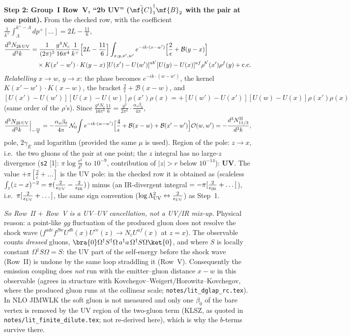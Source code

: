 \medskip
\noindent\textbf{Step 2: Group~I Row~V, ``2b UV'' ($\bar{\mf{C}}_{1}^{\dagger}\mf{B}_{2}$ with the pair at one point).} From the checked row, with the coefficient $\frac{1}{k^{+}}\int_{\Lambda}^{k^{+}-\Lambda}dp^{+}[\dots]=2L-\frac{11}{6}$,
\begin{align}
\frac{d^{3}N_{2b\,\rm UV}}{d^{3}k}&=\frac{1}{(2\pi)^{3}}\frac{g^{4}N_{c}}{16\pi^{4}}\frac{1}{k^{+}}\Big[2L-\frac{11}{6}\Big]\int_{x,y,x',w'}e^{-ik\cdot(x-w')}\Big[\frac{2}{\epsilon}+\mathcal{B}(y-x)\Big]\notag\\&\quad\times K(x'-w')\cdot K(y-x)\,[U(x')-U(w')]^{ab'}[U(y)-U(x)]^{af}\rho^{b'}(x')\rho^{f}(y)+{\rm c.c.}
\notag
\end{align}
\emph{Relabelling} $x\to w$, $y\to x$: the phase becomes $e^{-ik\cdot(w-w')}$, the kernel $K(x'-w')\cdot K(x-w)$, the bracket $\frac{2}{\epsilon}+\mathcal{B}(x-w)$, and $[U(x')-U(w')][U(x)-U(w)]\rho(x')\rho(x)=+[U(w')-U(x')][U(w)-U(x)]\rho(x')\rho(x)$ (same order of the $\rho$'s). Since $\frac{g^{4}N_{c}}{16\pi^{4}}\frac{11}{6}=\frac{g^{2}}{2\pi^{2}}\cdot\frac{\alpha_{s}\beta_{0}}{4\pi}$,
\begin{align}
\frac{d^{3}N_{2b\,\rm UV}}{d^{3}k}\Big|_{-\frac{11}{6}}=-\frac{\alpha_{s}\beta_{0}}{4\pi}\,\mathcal{N}_{0}\!\int e^{-ik\cdot(w-w')}\Big[\frac{4}{\epsilon}+\mathcal{B}(x-w)+\mathcal{B}(x'-w')\Big]\mathcal{O}(w,w')=-\frac{d^{3}N^{\rm II}_{11/3}}{d^{3}k},
\label{eq:pd-V}
\end{align}
pole, $2\gamma_{E}$ and logarithm (provided the same $\mu$ is used). Region of the pole: $z\to x$, i.e.\ the two gluons of the pair at one point; the $z$ integral has no large-$z$ divergence (\texttt{s2} [1]: $\pi\log\frac{r^{2}}{\delta^{2}}$ to $10^{-9}$, contribution of $|z|>r$ below $10^{-14}$): \textbf{UV}. The value $+\pi[\frac{2}{\epsilon}+\dots]$ is the UV pole: in the checked row it is obtained as (scaleless $\int_{z}(z-x)^{-2}=\pi(\frac{2}{\epsilon_{\rm UV}}-\frac{2}{\epsilon_{\rm IR}})$) minus (an IR-divergent integral $=-\pi[\frac{2}{\epsilon_{\rm IR}}+\dots]$), i.e.\ $\pi[\frac{2}{\epsilon_{\rm UV}}+\dots]$, the same sign convention ($\log\Lambda_{\rm UV}^{2}\leftrightarrow\frac{2}{\epsilon_{\rm UV}}$) as Step~1.

\noindent\emph{So Row~II $+$ Row~V is a UV--UV cancellation, not a UV/IR mix-up.} Physical reason: a point-like $gg$ fluctuation of the produced gluon does not resolve the shock wave ($f^{adc}f^{fbe}U^{db}(x)U^{ce}(z)\to N_{c}U^{af}(x)$ at $z=x$). The observable counts \emph{dressed} gluons, $\bra{0}\Omega^{\dagger}S^{\dagger}\Omega\,a^{\dagger}a\,\Omega^{\dagger}S\Omega\ket{0}$, and where $S$ is locally constant $\Omega^{\dagger}S\Omega=S$: the UV part of the self-energy before the shock wave (Row~II) is undone by the same loop straddling it (Row~V). Consequently the emission coupling does \emph{not} run with the emitter--gluon distance $x-w$ in this observable (agrees in structure with Kovchegov--Weigert/Horowitz--Kovchegov, where the produced gluon runs at the collinear scale; \texttt{notes/lit\_dglap\_rc.tex}). In NLO JIMWLK the soft gluon is not measured and only one $\beta_{0}$ of the bare vertex is removed by the UV region of the two-gluon term (KLSZ, as quoted in \texttt{notes/lit\_finite\_dilute.tex}; not re-derived here), which is why the $b$-terms survive there.

